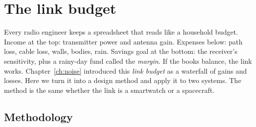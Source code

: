
\section{The link budget}
\label{sec:ch11:linkbudget}

Every radio engineer keeps a spreadsheet that reads like a household budget. Income at the top:
transmitter power and antenna gain. Expenses below: path loss, cable loss, walls, bodies, rain.
Savings goal at the bottom: the receiver's sensitivity, plus a rainy-day fund called the
\emph{margin}. If the books balance, the link works. Chapter~\ref{ch:noise} introduced this
\emph{link budget} as a waterfall of gains and losses. Here we turn it into a design method and
apply it to two systems. The method is the same whether the link is a smartwatch or a spacecraft.

\subsection{Methodology}

